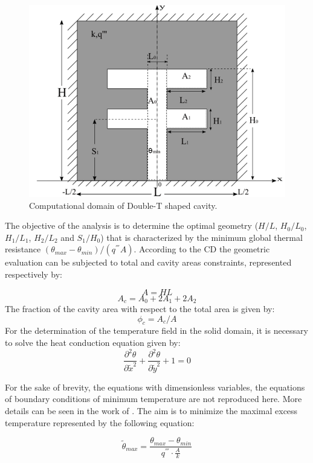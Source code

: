 \documentclass[12pt,fleqn]{article}
\newcommand\tab[1][0.75cm]{\hspace*{#1}}
\begin{document}
\begin{figure}[H]
\centering
\includegraphics[width=0.6\linewidth]{imgs/duplo_t.png}
\caption{ {\small Computational domain of Double-T shaped cavity.}}
\label{figure01}
\end{figure}

The objective of the analysis is to determine the optimal geometry ($H/L$, $H_{0}/L_{0}$, $H_{1}/L_{1}$, $H_{2}/L_{2}$ and $S_{1}/H_{0}$) that is characterized by the minimum global thermal resistance $(\theta_{max} - \theta_{min})/(q^{'''}A)$. According to the CD the geometric evaluation can be subjected to total and cavity areas constraints, represented respectively by:

\begin{equation}
A = HL \label{area_total}
\end{equation}
\begin{equation}
A_{c} = A_{0} + 2A_{1} + 2A_{2} \label{area_cavidade}
\end{equation}
\tab The fraction of the cavity area with respect to the total area is given by:
\begin{equation}
\phi_{c} = A_{c}/A \label{fi}
\end{equation}
\tab For the determination of the temperature field in the solid domain, it is necessary to solve the heat conduction equation given by:
\begin{equation}
\frac{\partial^{2} \theta}{\partial \tilde{x}^{2}}+\frac{\partial^{2} \theta}{\partial \tilde{y}^{2}}+1=0\label{calor}
\end{equation}

For the sake of brevity, the equations with dimensionless variables, the equations of boundary conditions of minimum temperature are not reproduced here. More details can be seen in the work of \cite{Gonzales2015b}. The aim is to minimize the maximal excess temperature represented by the following equation:

\begin{equation}
\tilde{\theta}_{max}=\frac{\theta_{max}-\theta_{min}}{q^{'''}\cdot\frac{A}{k}}\label{fo}
\end{equation}
\end{document}
